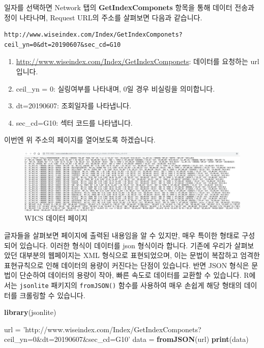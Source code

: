 \documentclass[]{book}
\newenvironment{Shaded}{\begin{snugshade}}{\end{snugshade}}
\newcommand{\KeywordTok}[1]{\textcolor[rgb]{0.13,0.29,0.53}{\textbf{#1}}}
\newcommand{\NormalTok}[1]{#1}
\newcommand{\StringTok}[1]{\textcolor[rgb]{0.31,0.60,0.02}{#1}}
\providecommand{\tightlist}{%
  \setlength{\itemsep}{0pt}\setlength{\parskip}{0pt}}
\begin{document}
일자를 선택하면 Network 탭의 \textbf{GetIndexComponets} 항목을 통해 데이터 전송과정이 나타나며, Request URL의 주소를 살펴보면 다음과 같습니다.

\begin{verbatim}
http://www.wiseindex.com/Index/GetIndexComponets?ceil_yn=0&dt=20190607&sec_cd=G10
\end{verbatim}

\begin{enumerate}
\def\labelenumi{\arabic{enumi}.}
\tightlist
\item
  \url{http://www.wiseindex.com/Index/GetIndexComponets}: 데이터를 요청하는 url 입니다.
\item
  ceil\_yn = 0: 실링여부를 나타내며, 0일 경우 비실링을 의미합니다.
\item
  dt=20190607: 조회일자를 나타냅니다.
\item
  sec\_cd=G10: 섹터 코드를 나타냅니다.
\end{enumerate}

이번엔 위 주소의 페이지를 열어보도록 하겠습니다.

\begin{figure}

{\centering \includegraphics[width=1\linewidth]{images/crawl_practice_wics3} 

}

\caption{WICS 데이터 페이지}\label{fig:unnamed-chunk-22}
\end{figure}

글자들을 살펴보면 페이지에 출력된 내용임을 알 수 있지만, 매우 특이한 형태로 구성되어 있습니다. 이러한 형식이 데이터를 json 형식이라 합니다. 기존에 우리가 살펴보았던 대부분의 웹페이지는 XML 형식으로 표현되었으며, 이는 문법이 복잡하고 엄격한 표현규칙으로 인해 데이터의 용량이 커진다는 단점이 있습니다. 반면 JSON 형식은 문법이 단순하여 데이터의 용량이 작아, 빠른 속도로 데이터를 교환할 수 있습니다. R에서는 \texttt{jsonlite} 패키지의 \texttt{fromJSON()} 함수를 사용하여 매우 손쉽게 해당 형태의 데이터를 크롤링할 수 있습니다.

\begin{Shaded}
\begin{Highlighting}[]
\KeywordTok{library}\NormalTok{(jsonlite)}

\NormalTok{url =}\StringTok{ 'http://www.wiseindex.com/Index/GetIndexComponets?ceil_yn=0&dt=20190607&sec_cd=G10'}
\NormalTok{data =}\StringTok{ }\KeywordTok{fromJSON}\NormalTok{(url)}
\KeywordTok{print}\NormalTok{(data)}
\end{Highlighting}
\end{Shaded}
\end{document}
